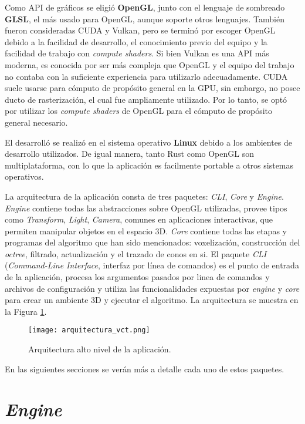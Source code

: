Como API de gráficos se eligió \textbf{OpenGL}, junto con el lenguaje de sombreado \textbf{GLSL}, el más usado para OpenGL, aunque soporte otros lenguajes.
También fueron consideradas CUDA y Vulkan, pero se terminó por escoger OpenGL debido a la facilidad de desarrollo, el conocimiento previo del equipo y la facilidad de trabajo con \textit{compute shaders}.
Si bien Vulkan es una API más moderna, es conocida por ser más compleja que OpenGL y el equipo del trabajo no contaba con la suficiente experiencia para utilizarlo adecuadamente.
CUDA suele usarse para cómputo de propósito general en la GPU, sin embargo, no posee ducto de rasterización, el cual fue ampliamente utilizado.
Por lo tanto, se optó por utilizar los \textit{compute shaders} de OpenGL para el cómputo de propósito general necesario.

El desarrolló se realizó en el sistema operativo \textbf{Linux} debido a los ambientes de desarrollo utilizados.
De igual manera, tanto Rust como OpenGL son multiplataforma, con lo que la aplicación es facilmente portable a otros sistemas operativos.

La arquitectura de la aplicación consta de tres paquetes: \textit{CLI}, \textit{Core} y \textit{Engine}.
\textit{Engine} contiene todas las abstracciones sobre OpenGL utilizadas, provee tipos como \textit{Transform}, \textit{Light}, \textit{Camera}, comunes en aplicaciones interactivas, que permiten manipular objetos en el espacio 3D.
\textit{Core} contiene todas las etapas y programas del algoritmo que han sido mencionados: voxelización, construcción del \textit{octree}, filtrado, actualización y el trazado de conos en si.
El paquete \textit{CLI} (\textit{Command-Line Interface}, interfaz por línea de comandos) es el punto de entrada de la aplicación, procesa los argumentos pasados por linea de comandos y archivos de configuración y utiliza las funcionalidades expuestas por \textit{engine} y \textit{core} para crear un ambiente 3D y ejecutar el algoritmo.
La arquitectura se muestra en la Figura \ref{fig:overall_architecture}.

\begin{figure}
    \centering
    \texttt{[image: arquitectura\_vct.png]}
    \caption{Arquitectura alto nivel de la aplicación.}
    \label{fig:overall_architecture}
\end{figure}

En las siguientes secciones se verán más a detalle cada uno de estos paquetes.

\section{\textit{Engine}}

